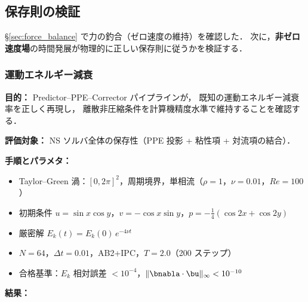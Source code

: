 %
\subsection{保存則の検証}
\label{sec:ns_conservation}

§\ref{sec:force_balance} で力の釣合（ゼロ速度の維持）を確認した．
次に，\textbf{非ゼロ速度場}の時間発展が物理的に正しい保存則に従うかを検証する．

\subsubsection{運動エネルギー減衰}
\label{sec:energy_conservation}

\noindent\textbf{目的：}
Predictor--PPE--Corrector パイプラインが，
既知の運動エネルギー減衰率を正しく再現し，
離散非圧縮条件を計算機精度水準で維持することを確認する．

\noindent\textbf{評価対象：}
NS ソルバ全体の保存性（PPE 投影 + 粘性項 + 対流項の結合）．

\noindent\textbf{手順とパラメタ：}
\begin{itemize}[noitemsep]
  \item Taylor--Green 渦：$[0, 2\pi]^2$，周期境界，単相流（$\rho = 1$，$\nu = 0.01$，$\mathit{Re} = 100$）
  \item 初期条件 $u = \sin x\cos y$，$v = -\cos x\sin y$，$p = -\tfrac{1}{4}(\cos 2x + \cos 2y)$
  \item 厳密解 $E_k(t) = E_k(0)\,e^{-4\nu t}$
  \item $N = 64$，$\Delta t = 0.01$，AB2+IPC，$T = 2.0$（200 ステップ）
  \item 合格基準：$E_k$ 相対誤差 $< 10^{-4}$，$\|\bnabla\cdot\bu\|_\infty < 10^{-10}$
\end{itemize}

\noindent\textbf{結果：}

